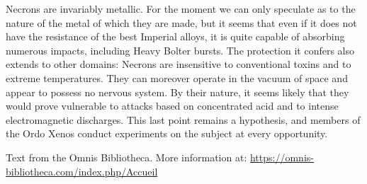 Necrons are invariably metallic. For the moment we can only speculate as to the nature of the metal of which they are made, but it seems that even if it does not have the resistance of the best Imperial alloys, it is quite capable of absorbing numerous impacts, including Heavy Bolter bursts. The protection it confers also extends to other domains: Necrons are insensitive to conventional toxins and to extreme temperatures. They can moreover operate in the vacuum of space and appear to possess no nervous system. By their nature, it seems likely that they would prove vulnerable to attacks based on concentrated acid and to intense electromagnetic discharges. This last point remains a hypothesis, and members of the Ordo Xenos conduct experiments on the subject at every opportunity.

Text from the Omnis Bibliotheca. More information at: \url{https://omnis-bibliotheca.com/index.php/Accueil}
